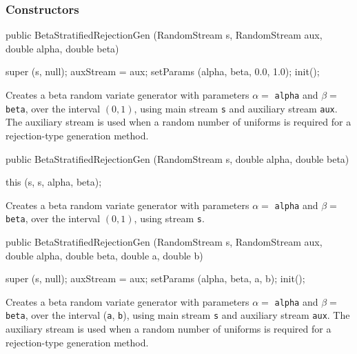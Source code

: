 \subsubsection* {Constructors}

\begin{code}

   public BetaStratifiedRejectionGen (RandomStream s, RandomStream aux,
                                       double alpha, double beta) \begin{hide} {
      super (s, null);
      auxStream = aux;
      setParams (alpha, beta, 0.0, 1.0);
      init();
   }\end{hide}
\end{code} 
\begin{tabb} Creates a beta random variate generator with parameters $\alpha =$ 
 \texttt{alpha} and $\beta =$ \texttt{beta}, over the interval $(0,1)$,
  using main stream \texttt{s} and auxiliary stream \texttt{aux}.
 The auxiliary stream is used when a random number of uniforms
 is required for a rejection-type generation method.
\end{tabb}
\begin{code}

   public BetaStratifiedRejectionGen (RandomStream s,
                                       double alpha, double beta) \begin{hide} {
      this (s, s, alpha, beta);
   }\end{hide}
\end{code} 
\begin{tabb} Creates a beta random variate generator with parameters $\alpha =$ 
 \texttt{alpha} and $\beta =$ \texttt{beta},  over the interval $(0,1)$,
  using stream \texttt{s}.
\end{tabb}
\begin{code}

   public BetaStratifiedRejectionGen (RandomStream s, RandomStream aux,
          double alpha, double beta, double a, double b) \begin{hide} {
      super (s, null);
      auxStream = aux;
      setParams (alpha, beta, a, b);
      init();
   }\end{hide}
\end{code} 
\begin{tabb} Creates a beta random variate generator with parameters $\alpha =$ 
 \texttt{alpha} and $\beta =$ \texttt{beta}, over the interval
 (\texttt{a}, \texttt{b}), 
  using main stream \texttt{s} and auxiliary stream \texttt{aux}.
 The auxiliary stream is used when a random number of uniforms
 is required for a rejection-type generation method.
\end{tabb}
